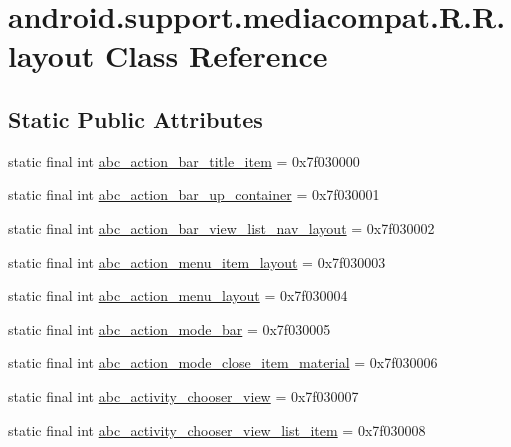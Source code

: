 \hypertarget{classandroid_1_1support_1_1mediacompat_1_1_r_1_1layout}{
\section{android.support.mediacompat.R.R.layout Class Reference}
\label{classandroid_1_1support_1_1mediacompat_1_1_r_1_1layout}
}
\subsection*{Static Public Attributes}
\begin{CompactItemize}
\item 
static final int \hyperlink{classandroid_1_1support_1_1mediacompat_1_1_r_1_1layout_dabddd446d87c24c3ff6b090e7d9450b}{abc\_\-action\_\-bar\_\-title\_\-item} = 0x7f030000
\item 
static final int \hyperlink{classandroid_1_1support_1_1mediacompat_1_1_r_1_1layout_124042dc233f778e1214461b4df862df}{abc\_\-action\_\-bar\_\-up\_\-container} = 0x7f030001
\item 
static final int \hyperlink{classandroid_1_1support_1_1mediacompat_1_1_r_1_1layout_7aac6748bc95c30144a5d56b3c7dcbee}{abc\_\-action\_\-bar\_\-view\_\-list\_\-nav\_\-layout} = 0x7f030002
\item 
static final int \hyperlink{classandroid_1_1support_1_1mediacompat_1_1_r_1_1layout_8b44be45029c9142e7b35483d0bdfa83}{abc\_\-action\_\-menu\_\-item\_\-layout} = 0x7f030003
\item 
static final int \hyperlink{classandroid_1_1support_1_1mediacompat_1_1_r_1_1layout_7ab832f29f4c567379ace598c8eb2213}{abc\_\-action\_\-menu\_\-layout} = 0x7f030004
\item 
static final int \hyperlink{classandroid_1_1support_1_1mediacompat_1_1_r_1_1layout_ff2b5eec1be1291ba244e9586ed5d738}{abc\_\-action\_\-mode\_\-bar} = 0x7f030005
\item 
static final int \hyperlink{classandroid_1_1support_1_1mediacompat_1_1_r_1_1layout_bc4924fea9cdedd2d601d7dcc2911825}{abc\_\-action\_\-mode\_\-close\_\-item\_\-material} = 0x7f030006
\item 
static final int \hyperlink{classandroid_1_1support_1_1mediacompat_1_1_r_1_1layout_4cadb9122d0a3e275cf39f8b57158853}{abc\_\-activity\_\-chooser\_\-view} = 0x7f030007
\item 
static final int \hyperlink{classandroid_1_1support_1_1mediacompat_1_1_r_1_1layout_198ebe2be0cd41dbe4a0782c42a86623}{abc\_\-activity\_\-chooser\_\-view\_\-list\_\-item} = 0x7f030008

\end{CompactItemize}
